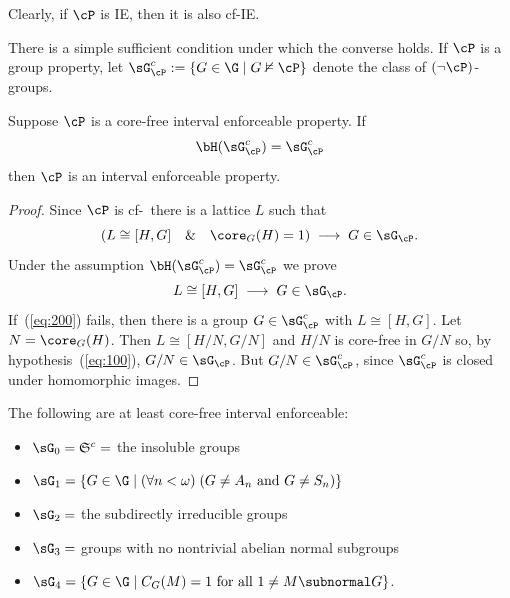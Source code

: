\begin{frame}[label=IEPropsConverseLemma]{}
Clearly, if $\cP$ is IE, then it is also cf-IE.
\vskip4mm

There is a simple sufficient condition under which the converse holds.
\vskip4mm
If $\cP$ is a group property, let
$\sG_{\cP}^c := \{G\in \G \mid G\nvDash \cP\}$
denote the class of $(\neg \cP)$-groups.

\begin{lemma}
\label{lemma-wjd-2}
Suppose $\cP$ is a core-free interval enforceable property.  
If 
\[
\bH(\sG_{\cP}^c) = \sG_{\cP}^c
\]
then $\cP$ is an interval enforceable property.
\end{lemma}
\end{frame}

\begin{frame}[label=IEPropsProof]{}
\begin{proof}
Since $\cP$ is cf-\IE\ there is a lattice $L$ such that
\begin{equation}
  \label{eq:100}
\left(L \cong [H,G] \quad \& \quad \core_G(H)=1\right) \; \longrightarrow \; G\in \sG_\cP.
\end{equation}
Under the assumption $\bH(\sG_\cP^c) = \sG_\cP^c$ we prove
\begin{equation}
  \label{eq:200}
L \cong [H,G] \; \longrightarrow \; G\in \sG_\cP.
\end{equation}
If~(\ref{eq:200}) fails, then there is a
group $G\in \sG_{\cP}^c$ with $L\cong [H,G]$.  Let $N = \core_G(H)$.  Then $L \cong
[H/N,G/N]$ and $H/N$ is core-free in $G/N$ so, by hypothesis~(\ref{eq:100}),
$G/N \in \sG_\cP$.  But $G/N \in \sG_{\cP}^c$, since $\sG_{\cP}^c$ is closed under homomorphic images.
\end{proof}
\end{frame}

\begin{frame}[label=IEProps]{}
The following are at least core-free interval enforceable:
\vskip5mm
\begin{itemize}
\item $\sG_0 = \mathfrak{S}^c = $ the insoluble groups
\vskip2mm
\item $\sG_1 =\{G\in \G \mid (\forall n<\omega) \; (G \neq A_n \text{ and }  G\neq S_n) \}$
\vskip2mm
\item $\sG_2 = $ the subdirectly irreducible groups
\vskip2mm
\item $\sG_3 = $ groups with no nontrivial abelian normal subgroups
\vskip2mm
\item $\sG_4 = \{G\in \G \mid C_G(M) = 1 \text{ for all } 1\neq M\subnormal G\}$.
\end{itemize}
\end{frame}

